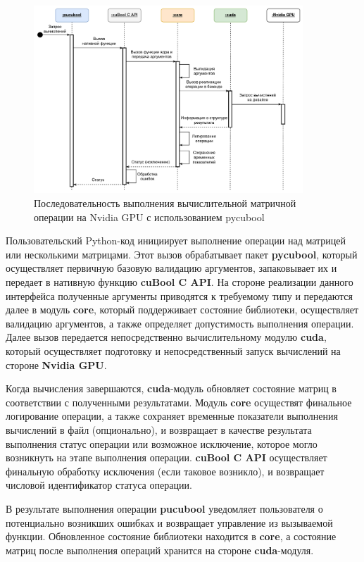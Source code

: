 \begin{figure}[h]
    \centering
    \includegraphics[width=0.9\textwidth]{images/library_sequence_use.png}
    \caption{Последовательность выполнения вычислительной матричной операции на Nvidia GPU с использованием pycubool}
    \label{fig:cubool_sequence}
\end{figure}


Пользовательский Python-код инициирует выполнение операции над матрицей или несколькими матрицами.
Этот вызов обрабатывает пакет \textbf{pycubool}, который осуществляет первичную базовую валидацию аргументов, запаковывает их и передает в нативную функцию \textbf{cuBool C API}.
На стороне реализации данного интерфейса полученные аргументы приводятся к требуемому типу и передаются далее в модуль \textbf{core}, 
который поддерживает состояние библиотеки, 
осуществляет валидацию аргументов, а также определяет допустимость выполнения операции. 
Далее вызов передается непосредственно вычислительному модулю \textbf{cuda}, 
который осуществляет подготовку и непосредственный запуск вычислений на стороне \textbf{Nvidia GPU}. 

Когда вычисления завершаются, \textbf{cuda}-модуль обновляет состояние матриц в соответствии с полученными результатами. 
Модуль \textbf{core} осуществят финальное логирование операции, 
а также сохраняет временные показатели выполнения вычислений в файл (опционально), 
и возвращает в качестве результата выполнения статус операции или возможное исключение, 
которое могло возникнуть на этапе выполнения операции. 
\textbf{cuBool C API} осуществляет финальную обработку исключения (если таковое возникло), 
и возвращает числовой идентификатор статуса операции. 

В результате выполнения операции \textbf{pucubool} уведомляет пользователя о потенциально возникших ошибках и возвращает управление из вызываемой функции. 
Обновленное состояние библиотеки находится в \textbf{core}, а состояние матриц после выполнения операций хранится на стороне \textbf{cuda}-модуля. 